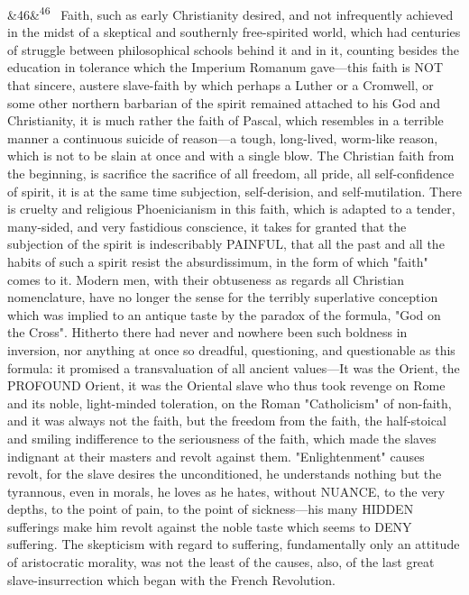 \documentclass[12pt]{article}
\newcommand{\para}[1][]{\par\noindent\ifx&#1&\else\textsuperscript{\footnotesize #1}~\fi}
\begin{document}
\para[46] Faith, such as early Christianity desired, and not infrequently achieved in the midst of a skeptical and southernly free-spirited world, which had centuries of struggle between philosophical schools behind it and in it, counting besides the education in tolerance which the Imperium Romanum gave---this faith is NOT that sincere, austere slave-faith by which perhaps a Luther or a Cromwell, or some other northern barbarian of the spirit remained attached to his God and Christianity, it is much rather the faith of Pascal, which resembles in a terrible manner a continuous suicide of reason---a tough, long-lived, worm-like reason, which is not to be slain at once and with a single blow. The Christian faith from the beginning, is sacrifice the sacrifice of all freedom, all pride, all self-confidence of spirit, it is at the same time subjection, self-derision, and self-mutilation. There is cruelty and religious Phoenicianism in this faith, which is adapted to a tender, many-sided, and very fastidious conscience, it takes for granted that the subjection of the spirit is indescribably PAINFUL, that all the past and all the habits of such a spirit resist the absurdissimum, in the form of which "faith" comes to it. Modern men, with their obtuseness as regards all Christian nomenclature, have no longer the sense for the terribly superlative conception which was implied to an antique taste by the paradox of the formula, "God on the Cross". Hitherto there had never and nowhere been such boldness in inversion, nor anything at once so dreadful, questioning, and questionable as this formula: it promised a transvaluation of all ancient values---It was the Orient, the PROFOUND Orient, it was the Oriental slave who thus took revenge on Rome and its noble, light-minded toleration, on the Roman "Catholicism" of non-faith, and it was always not the faith, but the freedom from the faith, the half-stoical and smiling indifference to the seriousness of the faith, which made the slaves indignant at their masters and revolt against them. "Enlightenment" causes revolt, for the slave desires the unconditioned, he understands nothing but the tyrannous, even in morals, he loves as he hates, without NUANCE, to the very depths, to the point of pain, to the point of sickness---his many HIDDEN sufferings make him revolt against the noble taste which seems to DENY suffering. The skepticism with regard to suffering, fundamentally only an attitude of aristocratic morality, was not the least of the causes, also, of the last great slave-insurrection which began with the French Revolution.
\end{document}
